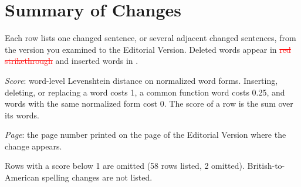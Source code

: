 \documentclass[10pt,a4paper]{article}
\begin{document}
\section*{Summary of Changes}
Each row lists one changed sentence, or several adjacent changed sentences, from the version you examined to the Editorial Version. Deleted words appear in \textcolor{red}{\sout{red strikethrough}} and inserted words in \textcolor{blue}{}.
\par \textit{Score}: word-level Levenshtein distance on normalized word forms. Inserting, deleting, or replacing a word costs 1, a common function word costs 0.25, and words with the same normalized form cost 0. The score of a row is the sum over its words.
\par \textit{Page}: the page number printed on the page of the Editorial Version where the change appears.
\par Rows with a score below 1 are omitted (58 rows listed, 2 omitted). British-to-American spelling changes are not listed.
\par\medskip
\end{document}

